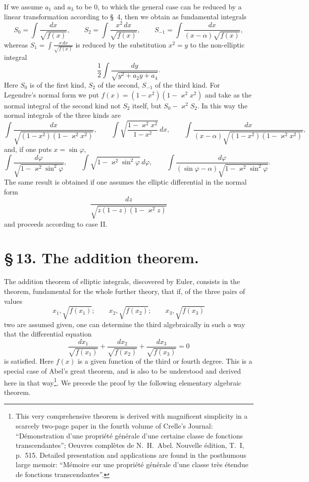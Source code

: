 \documentclass[11pt]{article}
\begin{document}
If we assume $a_1$ and $a_3$ to be $0$, to which the general case can be reduced by a linear transformation according to \S~4, then we obtain as fundamental integrals
\[
S_0=\int\frac{dx}{\sqrt{f(x)}},\qquad
S_2=\int\frac{x^2\,dx}{\sqrt{f(x)}},\qquad
S_{-1}=\int\frac{dx}{(x-\alpha)\sqrt{f(x)}},
\]
whereas $S_1=\int\frac{x\,dx}{\sqrt{f(x)}}$ is reduced by the substitution $x^2=y$ to the non-elliptic integral
\[
\frac12\int\frac{dy}{\sqrt{y^2+a_2y+a_4}}.
\]
Here $S_0$ is of the first kind, $S_2$ of the second, $S_{-1}$ of the third kind. For Legendre's normal form we put $f(x)=(1-x^2)(1-\varkappa^2x^2)$ and take as the normal integral of the second kind not $S_2$ itself, but $S_0-\varkappa^2S_2$. In this way the normal integrals of the three kinds are
\[
\int\frac{dx}{\sqrt{(1-x^2)(1-\varkappa^2x^2)}},\qquad
\int\sqrt{\frac{1-\varkappa^2x^2}{1-x^2}}\,dx,\qquad
\int\frac{dx}{(x-\alpha)\sqrt{(1-x^2)(1-\varkappa^2x^2)}},
\]
and, if one puts $x=\sin\varphi$,
\[
\int\frac{d\varphi}{\sqrt{1-\varkappa^2\sin^2\varphi}},\qquad
\int\sqrt{1-\varkappa^2\sin^2\varphi}\,d\varphi,\qquad
\int\frac{d\varphi}{(\sin\varphi-\alpha)\sqrt{1-\varkappa^2\sin^2\varphi}}.
\]
The same result is obtained if one assumes the elliptic differential in the normal form
\[
\frac{dz}{\sqrt{z(1-z)(1-\varkappa^2z)}}
\]
and proceeds according to case II.

\section*{\S\,13. The addition theorem.}

The addition theorem of elliptic integrals, discovered by Euler, consists in the theorem, fundamental for the whole further theory, that if, of the three pairs of values
\[
x_1,\sqrt{f(x_1)};\qquad x_2,\sqrt{f(x_2)};\qquad x_3,\sqrt{f(x_3)}
\]
two are assumed given, one can determine the third algebraically in such a way that the differential equation
\begin{equation}
\frac{dx_1}{\sqrt{f(x_1)}}+
\frac{dx_2}{\sqrt{f(x_2)}}+
\frac{dx_3}{\sqrt{f(x_3)}}=0
\tag{1}
\end{equation}
is satisfied. Here $f(x)$ is a given function of the third or fourth degree. This is a special case of Abel's great theorem, and is also to be understood and derived here in that way\footnote{This very comprehensive theorem is derived with magnificent simplicity in a scarcely two-page paper in the fourth volume of Crelle's Journal: ``Démonstration d'une propriété générale d'une certaine classe de fonctions transcendantes''; Oeuvres complètes de N.~H.~Abel. Nouvelle édition, T.~I, p.~515. Detailed presentation and applications are found in the posthumous large memoir: ``Mémoire sur une propriété générale d'une classe très étendue de fonctions transcendantes''.}. We precede the proof by the following elementary algebraic theorem.
\end{document}
